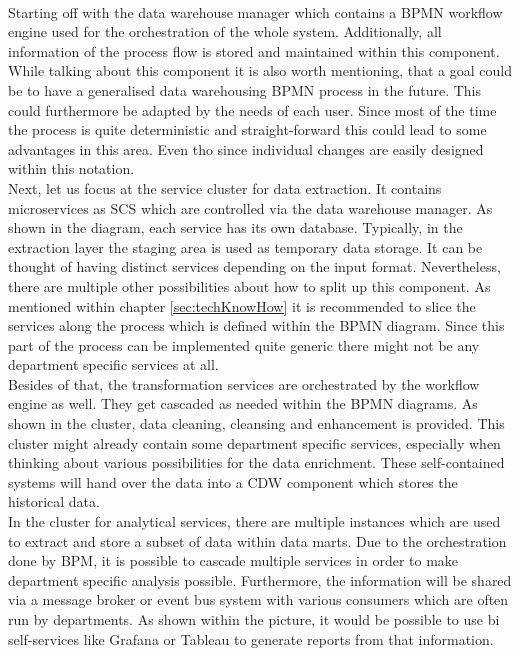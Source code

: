 \\
Starting off with the data warehouse manager which contains a BPMN workflow engine used for the orchestration of the whole system.  Additionally, all information of the process flow is stored and maintained within this component.\newline
While talking about this component it is also worth mentioning, that a goal could be to have a generalised data warehousing BPMN process in the future. This could furthermore be adapted by the needs of each user. Since most of the time the process is quite deterministic and straight-forward this could lead to some advantages in this area. Even tho since individual changes are easily designed within this notation. \newline
\\
Next, let us focus at the service cluster for data extraction. It contains microservices as SCS which are controlled via the data warehouse manager. As shown in the diagram, each service has its own database. Typically, in the extraction layer the staging area is used as temporary data storage.  It can be thought of having distinct services depending on the input format. Nevertheless, there are multiple other possibilities about how to split up this component. As mentioned within chapter \ref{sec:techKnowHow} it is recommended to slice the services along the process which is defined within the BPMN diagram. Since this part of the process can be implemented quite generic there might not be any department specific services at all.\newline
\\
Besides of that, the transformation services are orchestrated by the workflow engine as well. They get cascaded as needed within the BPMN diagrams. As shown in the cluster, data cleaning, cleansing and enhancement is provided. This cluster might already contain some department specific services, especially when thinking about various possibilities for the data enrichment.\newline
These self-contained systems will hand over the data into a CDW component which stores the historical data.\newline
\\
In the cluster for analytical services, there are multiple instances which are used to extract and store a subset of data within data marts. Due to the orchestration done by BPM, it is possible to cascade multiple services in order to make department specific analysis possible. Furthermore, the information will be shared via a message broker or event bus system with various consumers which are often run by departments. As shown within the picture, it would be possible to use \acrshort{bi} self-services like Grafana or Tableau to generate reports from that information.\newline
